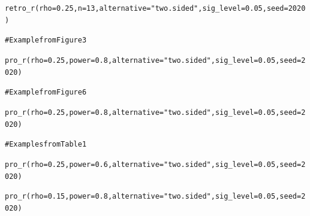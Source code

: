 \documentclass{article}\usepackage[]{graphicx}\usepackage[]{color}
\makeatletter
\newcommand{\hlnum}[1]{\textcolor[rgb]{0.063,0.58,0.627}{#1}}%
\newcommand{\hlstr}[1]{\textcolor[rgb]{0.063,0.58,0.627}{#1}}%
\newcommand{\hlcom}[1]{\textcolor[rgb]{0.588,0.588,0.588}{#1}}%
\newcommand{\hlstd}[1]{\textcolor[rgb]{0.196,0.196,0.196}{#1}}%
\newcommand{\hlkwc}[1]{\textcolor[rgb]{0,0.631,0.314}{#1}}%
\newcommand{\hlkwd}[1]{\textcolor[rgb]{0.78,0.227,0.412}{#1}}%
\newenvironment{kframe}{%
 \def\at@end@of@kframe{}%
 \ifinner\ifhmode%
  \def\at@end@of@kframe{\end{minipage}}%
  \begin{minipage}{\columnwidth}%
 \fi\fi%
 \def\FrameCommand##1{\hskip\@totalleftmargin \hskip-\fboxsep
 \colorbox{shadecolor}{##1}\hskip-\fboxsep
     \hskip-\linewidth \hskip-\@totalleftmargin \hskip\columnwidth}%
 \MakeFramed {\advance\hsize-\width
   \@totalleftmargin\z@ \linewidth\hsize
   \@setminipage}}%
 {\par\unskip\endMakeFramed%
 \at@end@of@kframe}
\newenvironment{knitrout}{}{} %
\makeatother
\begin{document}
\begin{refsection}
\begin{knitrout}
\begin{kframe}
\begin{alltt}
\hlkwd{retro_r}\hlstd{(}\hlkwc{rho} \hlstd{=} \hlnum{0.25}\hlstd{,} \hlkwc{n} \hlstd{=} \hlnum{13}\hlstd{,} \hlkwc{alternative} \hlstd{=} \hlstr{"two.sided"}\hlstd{,} \hlkwc{sig_level} \hlstd{=} \hlnum{0.05}\hlstd{,} \hlkwc{seed} \hlstd{=} \hlnum{2020}\hlstd{)}
\end{alltt}
\end{kframe}
\end{knitrout}

\begin{knitrout}
\color{fgcolor}\begin{kframe}
\begin{alltt}
\hlcom{# Example from Figure 3}

\hlkwd{pro_r}\hlstd{(}\hlkwc{rho} \hlstd{=} \hlnum{0.25}\hlstd{,} \hlkwc{power} \hlstd{=} \hlnum{0.8}\hlstd{,} \hlkwc{alternative} \hlstd{=} \hlstr{"two.sided"}\hlstd{,} \hlkwc{sig_level} \hlstd{=} \hlnum{0.05}\hlstd{,} \hlkwc{seed} \hlstd{=} \hlnum{2020}\hlstd{)}
\end{alltt}
\end{kframe}
\end{knitrout}

\begin{knitrout}
\color{fgcolor}\begin{kframe}
\begin{alltt}
\hlcom{# Example from Figure 6}

\hlkwd{pro_r}\hlstd{(}\hlkwc{rho} \hlstd{=} \hlnum{0.25}\hlstd{,} \hlkwc{power} \hlstd{=} \hlnum{0.8}\hlstd{,} \hlkwc{alternative} \hlstd{=} \hlstr{"two.sided"}\hlstd{,} \hlkwc{sig_level} \hlstd{=} \hlnum{0.05}\hlstd{,} \hlkwc{seed} \hlstd{=} \hlnum{2020}\hlstd{)}
\end{alltt}
\end{kframe}
\end{knitrout}

\begin{knitrout}
\color{fgcolor}\begin{kframe}
\begin{alltt}
\hlcom{# Examples from Table 1}

\hlkwd{pro_r}\hlstd{(}\hlkwc{rho} \hlstd{=} \hlnum{0.25}\hlstd{,} \hlkwc{power} \hlstd{=} \hlnum{0.6}\hlstd{,} \hlkwc{alternative} \hlstd{=} \hlstr{"two.sided"}\hlstd{,} \hlkwc{sig_level} \hlstd{=} \hlnum{0.05}\hlstd{,} \hlkwc{seed} \hlstd{=} \hlnum{2020}\hlstd{)}

\hlkwd{pro_r}\hlstd{(}\hlkwc{rho} \hlstd{=} \hlnum{0.15}\hlstd{,} \hlkwc{power} \hlstd{=} \hlnum{0.8}\hlstd{,} \hlkwc{alternative} \hlstd{=} \hlstr{"two.sided"}\hlstd{,} \hlkwc{sig_level} \hlstd{=} \hlnum{0.05}\hlstd{,} \hlkwc{seed} \hlstd{=} \hlnum{2020}\hlstd{)}


\end{alltt}
\end{kframe}
\end{knitrout}
\end{refsection}
\end{document}
